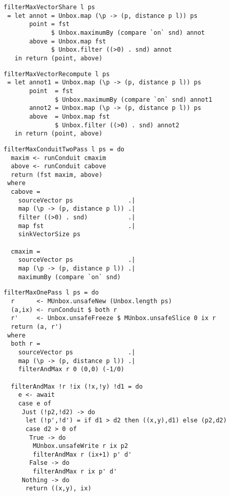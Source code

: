 \begin{lstlisting}[float,label=l:a:bench:filterMaxVectorShare,caption=Vector / share implementation of filterMax]
filterMaxVectorShare l ps
 = let annot = Unbox.map (\p -> (p, distance p l)) ps
       point = fst
             $ Unbox.maximumBy (compare `on` snd) annot
       above = Unbox.map fst
             $ Unbox.filter ((>0) . snd) annot
   in return (point, above)
\end{lstlisting}

\begin{lstlisting}[float,label=l:a:bench:filterMaxVectorRecompute,caption=Vector / recompute implementation of filterMax]
filterMaxVectorRecompute l ps
 = let annot1 = Unbox.map (\p -> (p, distance p l)) ps
       point  = fst
              $ Unbox.maximumBy (compare `on` snd) annot1
       annot2 = Unbox.map (\p -> (p, distance p l)) ps
       above  = Unbox.map fst
              $ Unbox.filter ((>0) . snd) annot2
   in return (point, above)
\end{lstlisting}

\begin{lstlisting}[float,label=l:a:bench:filterMaxConduitTwoPass,caption=Conduit 2-pass implementation of filterMax]
filterMaxConduitTwoPass l ps = do
  maxim <- runConduit cmaxim
  above <- runConduit cabove
  return (fst maxim, above)
 where
  cabove =
    sourceVector ps               .|
    map (\p -> (p, distance p l)) .|
    filter ((>0) . snd)           .|
    map fst                       .|
    sinkVectorSize ps

  cmaxim =
    sourceVector ps               .|
    map (\p -> (p, distance p l)) .|
    maximumBy (compare `on` snd)
\end{lstlisting}

\begin{lstlisting}[float,label=l:a:bench:filterMaxConduitOnePass,caption=Conduit one-pass (hand-fused) implementation of filterMax]
filterMaxOnePass l ps = do
  r      <- MUnbox.unsafeNew (Unbox.length ps)
  (a,ix) <- runConduit $ both r
  r'     <- Unbox.unsafeFreeze $ MUnbox.unsafeSlice 0 ix r
  return (a, r')
 where
  both r =
    sourceVector ps               .|
    map (\p -> (p, distance p l)) .|
    filterAndMax r 0 (0,0) (-1/0)

  filterAndMax !r !ix (!x,!y) !d1 = do
    e <- await
    case e of
     Just (!p2,!d2) -> do
      let (!p',!d') = if d1 > d2 then ((x,y),d1) else (p2,d2)
      case d2 > 0 of
       True -> do
        MUnbox.unsafeWrite r ix p2
        filterAndMax r (ix+1) p' d'
       False -> do
        filterAndMax r ix p' d'
     Nothing -> do
      return ((x,y), ix)
\end{lstlisting}


